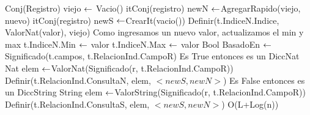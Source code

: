 {				\Else
					\State Conj(Registro) viejo $\leftarrow$ Vacio() 
					\State itConj(registro) newN $\leftarrow$AgregarRapido(viejo, nuevo)
					\State itConj(registro) newS $\leftarrow$CrearIt(vacio())
					\State Definir(t.IndiceN.Indice, ValorNat(valor), viejo) 
					\State Como ingresamos un nuevo valor, actualizamos el min y max
					 
						\State t.IndiceN.Min $\leftarrow$ valor
					\EndIf
						\State t.IndiceN.Max $\leftarrow$ valor
					\EndIf
				\EndIf
			\EndIf
		\EndIf
	\EndIf
	\State Bool BasadoEn $\leftarrow$ Significado(t.campos, t.RelacionInd.CampoR)
		\State Es True entonces es un DiccNat
		\State Nat elem $\leftarrow$ValorNat(Significado(r, t.RelacionInd.CampoR))
		\State Definir(t.RelacionInd.ConsultaN, elem, $< newS, newN >$)
	\Else
		\State Es False entonces es un DiccString
		\State String elem $\leftarrow$ValorString(Significado(r, t.RelacionInd.CampoR))
		\State Definir(t.RelacionInd.ConsultaS, elem, $< newS, newN >$)
	\EndIf
}{O(L+Log(n))}
